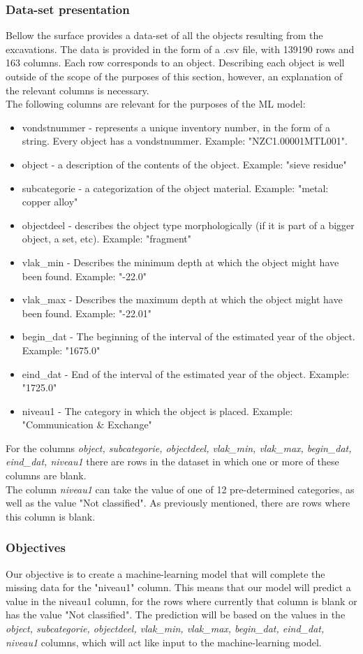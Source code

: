 \subsubsection{Data-set presentation}
Bellow the surface provides a data-set\cite{BelowAmsterdam} of all the objects resulting from the excavations. The data is provided in the form of a .csv file, with 139190 rows and 163 columns. Each row corresponds to an object. Describing each object is well outside of the scope of the purposes of this section, however, an explanation of the relevant columns is necessary. \\
The following columns are relevant for the purposes of the ML model: 
\begin{itemize}
    \item vondstnummer - represents a unique inventory number, in the form of a string. Every object has a vondstnummer. Example: "NZC1.00001MTL001".
    \item  object -  a description of the contents of the object. Example: "sieve residue"
    \item  subcategorie - a categorization of the object material. Example: "metal: copper alloy"
    \item objectdeel - describes the object type morphologically (if it is part of a bigger object, a set, etc). Example: "fragment"
    \item vlak\_min - Describes the minimum depth at which the object might have been found. Example: "-22.0"
    \item vlak\_max - Describes the maximum depth at which the object might have been found. Example: "-22.01"
    \item begin\_dat - The beginning of the interval of the estimated year of the object. Example: "1675.0"
    \item eind\_dat - End of the interval of the estimated year of the object. Example: "1725.0"
    \item niveau1 - The category in which the object is placed. Example:  "Communication \& Exchange"
\end{itemize}
For the columns \textit{object, subcategorie, objectdeel, vlak\_min, vlak\_max, begin\_dat, eind\_dat,  niveau1} there are rows in the dataset in which one or more of these columns are blank.  \\
The column \textit{niveau1} can take the value of one of 12 pre-determined categories, as well as the value "Not classified". As previously mentioned, there are rows where this column is blank. 
\subsubsection{Objectives}
Our objective is to create a machine-learning model that will complete the missing data for the "niveau1" column. This means that our model will predict a value in the niveau1 column, for the rows where currently that column is blank or has the value "Not classified". The prediction will be based on the values in the \textit{object, subcategorie, objectdeel, vlak\_min, vlak\_max, begin\_dat, eind\_dat,  niveau1} columns, which will act like input to the machine-learning model. 
